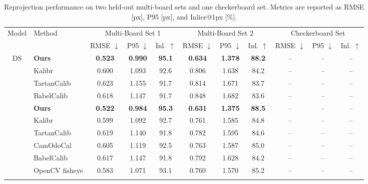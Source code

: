 \documentclass[letterpaper, 10 pt, conference]{ieeeconf}  %
\begin{document}
\begin{table}[t]
  \centering
  \caption{Reprojection performance on two held-out multi-board sets and one checkerboard set. Metrics are reported as RMSE [px], P95 [px], and Inlier@1px [\%].}
  \label{tab:reprojection_comparison}
  \scriptsize
  \renewcommand{\arraystretch}{1.06}
  \setlength{\tabcolsep}{2.6pt}
  \begin{tabular*}{\textwidth}{@{\extracolsep{\fill}}clccccccccc@{}}
  \toprule
  \multirow{2}{*}{Model} & \multirow{2}{*}{Method}
  & \multicolumn{3}{c}{Multi-Board Set 1}
  & \multicolumn{3}{c}{Multi-Board Set 2}
  & \multicolumn{3}{c}{Checkerboard Set} \\
  \cmidrule(lr){3-5}\cmidrule(lr){6-8}\cmidrule(lr){9-11}
  & & RMSE $\downarrow$ & P95 $\downarrow$ & Inl. $\uparrow$
    & RMSE $\downarrow$ & P95 $\downarrow$ & Inl. $\uparrow$
    & RMSE $\downarrow$ & P95 $\downarrow$ & Inl. $\uparrow$ \\
  \midrule
  \multirow{4}{*}{DS}
  & \textbf{Ours}       & \textbf{0.523} & \textbf{0.990} & \textbf{95.1} & \textbf{0.634} & \textbf{1.378} & \textbf{88.2} & -- & -- & -- \\
  & Kalibr              & 0.600 & 1.093 & 92.6 & 0.806 & 1.638 & 84.2 & -- & -- & -- \\
  & TartanCalib         & 0.623 & 1.155 & 91.7 & 0.814 & 1.671 & 83.7 & -- & -- & -- \\
  & BabelCalib          & 0.618 & 1.147 & 91.7 & 0.848 & 1.682 & 83.6 & -- & -- & -- \\
  \addlinespace[2pt]
  
  \multirow{6}{*}{KB}
  & \textbf{Ours}       & \textbf{0.522} & \textbf{0.984} & \textbf{95.3} & \textbf{0.631} & \textbf{1.375} & \textbf{88.5} & -- & -- & -- \\
  & Kalibr              & 0.599 & 1.092 & 92.7 & 0.761 & 1.585 & 84.8 & -- & -- & -- \\
  & TartanCalib         & 0.619 & 1.140 & 91.8 & 0.782 & 1.595 & 84.6 & -- & -- & -- \\
  & CamOdoCal           & 0.605 & 1.119 & 92.5 & 0.763 & 1.587 & 85.0 & -- & -- & -- \\
  & BabelCalib          & 0.617 & 1.147 & 91.8 & 0.792 & 1.628 & 84.2 & -- & -- & -- \\
  & OpenCV fisheye      & 0.583 & 1.071 & 93.1 & 0.760 & 1.570 & 85.2 & -- & -- & -- \\
  \addlinespace[2pt]
  

\end{tabular*}
\end{table}
\end{document}

